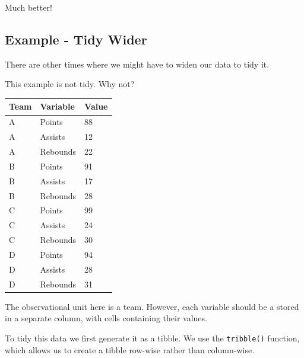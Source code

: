 \documentclass[
  12pt,
]{book}
\begin{document}
Much better!

\hypertarget{example---tidy-wider}{%
\subsection{Example - Tidy Wider}\label{example---tidy-wider}}

There are other times where we might have to widen our data to tidy it.

This example is not tidy. Why not?

\begin{longtable}[]{@{}lll@{}}
\toprule()
Team & Variable & Value \\
\midrule()
\endhead
A & Points & 88 \\
A & Assists & 12 \\
A & Rebounds & 22 \\
B & Points & 91 \\
B & Assists & 17 \\
B & Rebounds & 28 \\
C & Points & 99 \\
C & Assists & 24 \\
C & Rebounds & 30 \\
D & Points & 94 \\
D & Assists & 28 \\
D & Rebounds & 31 \\
\bottomrule()
\end{longtable}

The observational unit here is a team. However, each variable should be a stored in a separate column, with cells containing their values.

To tidy this data we first generate it as a tibble. We use the \texttt{tribble()} function, which allows us to create a tibble row-wise rather than column-wise.
\end{document}
